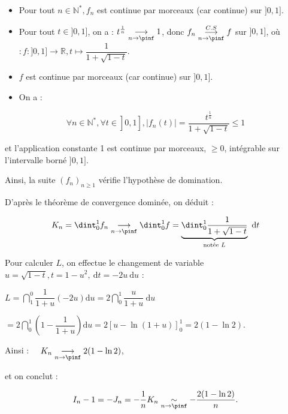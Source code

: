 \begin{enumerate}
\begin{itemize}
  \item Pour tout $n \in \mathbb{N}^{*}, f_{n}$ est continue par morceaux (car continue) sur $] 0,1]$.

  \item Pour tout $t \in] 0,1]$, on a : $t^{\frac{1}{n}} \underset{n\to\pinf}{\longrightarrow} 1$, donc $f_{n} \underset{n\to\pinf}{\stackrel{C . S}{\longrightarrow}} f$ sur $]0,1]$, où $: f:] 0,1] \longrightarrow \mathbb{R}, t \longmapsto \dfrac{1}{1+\sqrt{1-t}}$.

  \item $f$ est continue par morceaux (car continue) sur $] 0,1]$.

  \item On a :

\end{itemize}

$$
\left.\left.\forall n \in \mathbb{N}^{*}, \forall t \in\right] 0,1\right],\left|f_{n}(t)\right|=\dfrac{t^{\frac{1}{n}}}{1+\sqrt{1-t}} \leqslant 1
$$

et l'application constante 1 est continue par morceaux, $\geqslant 0$, intégrable sur l'intervalle borné $] 0,1]$.

Ainsi, la suite $\left(f_{n}\right)_{n \geqslant 1}$ vérifie l'hypothèse de domination.

D'après le théorème de convergence dominée, on déduit :

$$
K_{n}=\dint_{0}^{1} f_{n} \underset{n\to\pinf}{\longrightarrow} \dint_{0}^{1} f=\underbrace{\dint_{0}^{1} \dfrac{1}{1+\sqrt{1-t}}}_{\text {notée } L} \mathrm{~d} t
$$

Pour calculer $L$, on effectue le changement de variable $u=\sqrt{1-t}, t=1-u^{2}, \mathrm{~d} t=-2 u \mathrm{~d} u$ :

$L=\dint_{1}^{0} \dfrac{1}{1+u}(-2 u) \mathrm{d} u=2 \dint_{0}^{1} \dfrac{u}{1+u} \mathrm{~d} u$

$=2 \dint_{0}^{1}\left(1-\dfrac{1}{1+u}\right) \mathrm{d} u=2[u-\ln (1+u)]_{0}^{1}=2(1-\ln 2)$.

Ainsi : $\quad K_{n} \underset{n\to\pinf}{\longrightarrow} 2(1-\ln 2)$,

et on conclut :

$$
I_{n}-1=-J_{n}=-\dfrac{1}{n} K_{n} \underset{n\to\pinf}{\sim}-\dfrac{2(1-\ln 2)}{n} .
$$
\end{enumerate}
